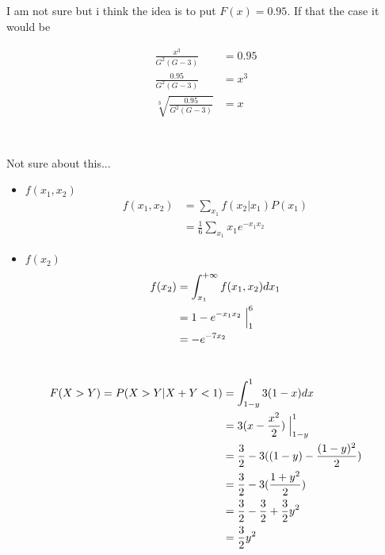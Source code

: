\documentclass[12pt, a4paper]{article}
\begin{document}
\subsection{}
I am not sure but i think the idea is to put $F(x) = 0.95$. If that the case it would be 

\begin{subequations}
  \begin{align}
    \frac{x^3}{G^2(G - 3)}  &= 0.95\\
    \frac{0.95}{G^2(G - 3)} &= x^3\\
    \sqrt[3]{\frac{0.95}{G^2(G - 3)}} &= x\\
  \end{align}
\end{subequations}

\section{}

Not sure about this...

\begin{itemize}
  \item $f(x_1, x_2)$
  \begin{subequations}
    \begin{align}
      f(x_1,x_2) &= \sum_{x_1}f(x_2 | x_1)P(x_1)\\
                 &= \frac{1}{6}\sum_{x_1}x_1e^{-x_1x_2}
    \end{align}
  \end{subequations}
  \item $f(x_2)$
  \begin{subequations}
    \begin{align}
      f(x_2) &= \int_{x_1}^{+\infty}f(x_1, x_2) dx_1 \\
                 &= 1-e^{-x_1x_2}\Bigm|_1^6\\
                 &= -e^{-7x_2}
    \end{align}
  \end{subequations}
\end{itemize}

\section{}
\subsection{}
\begin{subequations}
  \begin{align}
    F(X > Y) = P(X > Y | X + Y < 1) &= \int_{1-y}^1 3(1 - x) dx \\
               &= 3(x - \frac{x^2}{2})\Bigm|_{1-y}^1\\
               &= \frac{3}{2} - 3((1-y) - \frac{(1-y)^2}{2})\\
               &= \frac{3}{2} - 3(\frac{1+y^2}{2})\\
               &= \frac{3}{2} - \frac{3}{2} + \frac{3}{2}y^2\\
               &= \frac{3}{2}y^2
  \end{align}
\end{subequations}
\end{document}

